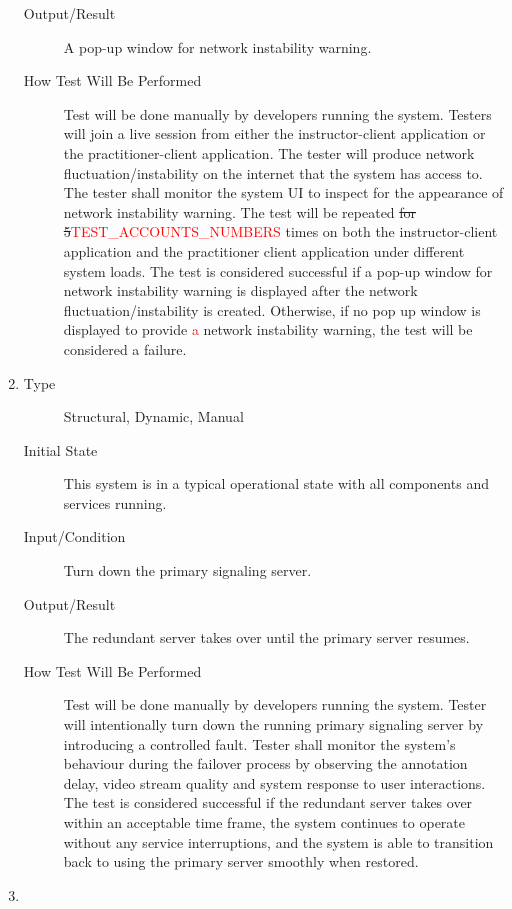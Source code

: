 \documentclass[12pt, titlepage]{article}
\newcommand{\rt}[1]{\textcolor{red}{#1}}
\begin{document}
\begin{enumerate}[NFR-T1]
\begin{description}
  \item[Output/Result] A pop\rt{-}up window for network instability warning.
  \item[How Test Will Be Performed] Test will be done manually by developers
    running the system. Testers will join a live session from either the
    instructor\rt{-}client application or the practitioner\rt{-}client application. The
    tester will produce network fluctuation/instability on the internet that the
    system has access to. The tester shall monitor the system UI to inspect for
    the appearance of network instability warning. The test will be repeated \sout{for}
    \sout{5}\rt{TEST\_ACCOUNTS\_NUMBERS} times on both the instructor\rt{-}client application and the practitioner
    client application under different system loads. The test is considered
    successful if a pop\rt{-}up window for network instability warning is displayed
    after the network fluctuation/instability is created. Otherwise, if no pop
    up window is displayed to provide \rt{a} network instability warning, the test will
    be considered a failure.
  \end{description}
\item \label{NFRT9}
  \begin{description}
  \item[Type] Structural, Dynamic, Manual
  \item[Initial State] This system is in a typical operational state with all
    components and services running.
  \item[Input/Condition] Turn down the primary signaling server.
  \item[Output/Result] The redundant server takes over until the primary server
    resumes.
  \item[How Test Will Be Performed] Test will be done manually by developers
    running the system. Tester will intentionally turn down the running primary
    signaling server by introducing a controlled fault. Tester shall monitor the
    system’s behaviour during the failover process by observing the annotation
    delay, video stream quality and system response to user interactions. The
    test is considered successful if the redundant server takes over within an
    acceptable time frame, the system continues to operate without any service
    interruptions, and the system is able to transition back to using the
    primary server smoothly when restored.
  \end{description}
\item \label{NFRT10}

\end{enumerate}
\end{document}
